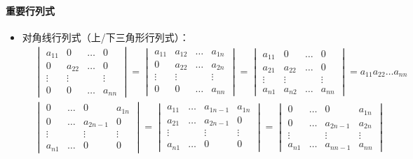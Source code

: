 \documentclass[
12pt, %
a4paper, 
oneside, %
headinclude,footinclude, %
]{scrartcl}
\begin{document}
\paragraph{重要行列式}
\begin{itemize}
\item 对角线行列式（上/下三角形行列式）：
{\footnotesize
\begin{align*}
&\begin{vmatrix} a_{1 1} & 0 & \dots & 0 \\ 0 & a_{2 2} & \dots & 0 \\ \vdots & \vdots & & \vdots \\ 0 & 0 & \dots & a_{n n} \end{vmatrix} 
= \begin{vmatrix} a_{1 1} & a_{1 2} & \dots & a_{1 n} \\ 0 & a_{2 2} & \dots & a_{2 n} \\ \vdots & \vdots & & \vdots \\ 0 & 0 & \dots & a_{n n} \end{vmatrix} 
= \begin{vmatrix} a_{1 1} & 0 & \dots & 0 \\ a_{2 1} & a_{2 2} & \dots & 0 \\ \vdots & \vdots & & \vdots \\ a_{n 1} & a_{n 2} & \dots & a_{n n} \end{vmatrix}
= a_{1 1} a_{2 2} \dots a_{n n} \\  
&\begin{vmatrix} 0 & \dots & 0 & a_{1 n} \\ 0 & \dots & a_{2 n - 1} & 0 \\ \vdots & & \vdots & \vdots \\ a_{n 1} & \dots & 0 & 0 \end{vmatrix} 
= \begin{vmatrix} a_{1 1} & \dots & a_{1 n - 1} & a_{1 n} \\ a_{2 1} & \dots & a_{2 n - 1} & 0 \\ \vdots & & \vdots & \vdots \\ a_{n 1} & \dots & 0 & 0 \end{vmatrix} 
= \begin{vmatrix} 0 & \dots & 0 & a_{1 n} \\ 0 & \dots & a_{2 n - 1} & a_{2 n} \\ \vdots & & \vdots & \vdots \\ a_{n 1} & \dots & a_{n n - 1} & a_{n n} \end{vmatrix}

\end{align*}}
\end{itemize}
\end{document}
